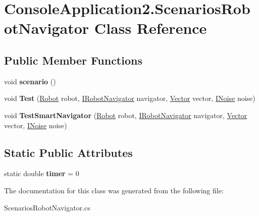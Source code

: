 \hypertarget{class_console_application2_1_1_scenarios_robot_navigator}{}\section{Console\+Application2.\+Scenarios\+Robot\+Navigator Class Reference}
\label{class_console_application2_1_1_scenarios_robot_navigator}
\subsection*{Public Member Functions}
\begin{DoxyCompactItemize}
\item 
\hypertarget{class_console_application2_1_1_scenarios_robot_navigator_acc3d1574d6aa58ef5429be2d6f00b961}{}void {\bfseries scenario} ()\label{class_console_application2_1_1_scenarios_robot_navigator_acc3d1574d6aa58ef5429be2d6f00b961}

\item 
\hypertarget{class_console_application2_1_1_scenarios_robot_navigator_a4d8f87ae455e1aa3f429995cc9d64575}{}void {\bfseries Test} (\hyperlink{class_console_application2_1_1_robot}{Robot} robot, \hyperlink{interface_console_application2_1_1_i_robot_navigator}{I\+Robot\+Navigator} navigator, \hyperlink{class_console_application2_1_1_vector}{Vector} vector, \hyperlink{interface_console_application2_1_1_i_noise}{I\+Noise} noise)\label{class_console_application2_1_1_scenarios_robot_navigator_a4d8f87ae455e1aa3f429995cc9d64575}

\item 
\hypertarget{class_console_application2_1_1_scenarios_robot_navigator_a9853bfbe0703898d4ee8b3121b0926d9}{}void {\bfseries Test\+Smart\+Navigator} (\hyperlink{class_console_application2_1_1_robot}{Robot} robot, \hyperlink{interface_console_application2_1_1_i_robot_navigator}{I\+Robot\+Navigator} navigator, \hyperlink{class_console_application2_1_1_vector}{Vector} vector, \hyperlink{interface_console_application2_1_1_i_noise}{I\+Noise} noise)\label{class_console_application2_1_1_scenarios_robot_navigator_a9853bfbe0703898d4ee8b3121b0926d9}

\end{DoxyCompactItemize}
\subsection*{Static Public Attributes}
\begin{DoxyCompactItemize}
\item 
\hypertarget{class_console_application2_1_1_scenarios_robot_navigator_a488b0381548340360fd8ffeb0e42fee7}{}static double {\bfseries timer} = 0\label{class_console_application2_1_1_scenarios_robot_navigator_a488b0381548340360fd8ffeb0e42fee7}

\end{DoxyCompactItemize}


The documentation for this class was generated from the following file\+:\begin{DoxyCompactItemize}
\item 
Scenarios\+Robot\+Navigator.\+cs\end{DoxyCompactItemize}
